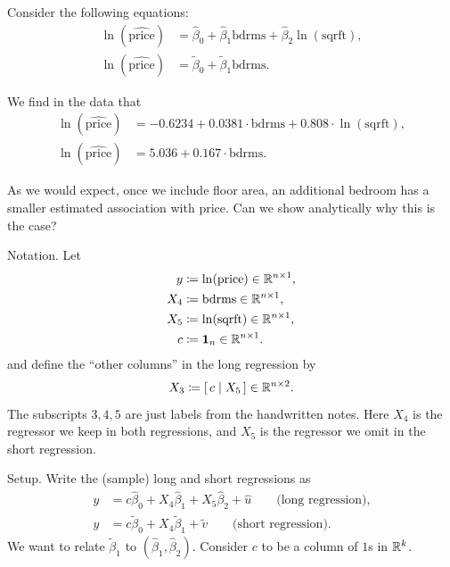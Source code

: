 	\begin{remark}
		Consider the following equations:
		\[
			\begin{aligned}
				\ln(\widehat{\text{price}}) &= \hat{\beta}_0 + \hat{\beta}_1 \text{bdrms} + \hat{\beta}_2 \ln(\text{sqrft}), \\
				\ln(\widehat{\text{price}}) &= \tilde{\beta}_0 + \tilde{\beta}_1 \text{bdrms}.
			\end{aligned}
		\]

		We find in the data that
		\[
			\begin{aligned}
				\ln(\widehat{\text{price}}) &= -0.6234 + 0.0381 \cdot \text{bdrms} + 0.808 \cdot \ln(\text{sqrft}), \\
				\ln(\widehat{\text{price}}) &= 5.036 + 0.167 \cdot \text{bdrms}.
			\end{aligned}
		\]

	As we would expect, once we include floor area, an additional bedroom has a smaller estimated association with price.
	Can we show analytically why this is the case?

		Notation.
		Let
		\[
			\begin{aligned}
				y &\coloneqq \ln(\text{price}) \in \mathbb{R}^{n\times 1}, \\
				X_4 &\coloneqq \text{bdrms} \in \mathbb{R}^{n\times 1}, \\
				X_5 &\coloneqq \ln(\text{sqrft}) \in \mathbb{R}^{n\times 1}, \\
				c &\coloneqq \mathbf{1}_n \in \mathbb{R}^{n\times 1}.
			\end{aligned}
		\]
		and define the ``other columns'' in the long regression by
		\[
			X_3 \coloneqq [\,c \mid X_5\,] \in \mathbb{R}^{n\times 2}.
		\]
		The subscripts $3,4,5$ are just labels from the handwritten notes.
		Here $X_4$ is the regressor we keep in both regressions, and $X_5$ is the regressor we omit in the short regression.

	Setup.
	Write the (sample) long and short regressions as
	\begin{align*}
		y &= c\hat{\beta}_0 + X_4\hat{\beta}_1 + X_5\hat{\beta}_2 + \hat{u}
		\qquad \text{(long regression),} \\
		y &= c\tilde{\beta}_0 + X_4\tilde{\beta}_1 + \tilde{v}
		\qquad \text{(short regression).}
	\end{align*}
	We want to relate $\tilde{\beta}_1$ to $(\hat{\beta}_1,\hat{\beta}_2)$. Consider $c$ to be a column of $1$s in $\mathbb{R}^k$.


\end{remark}
